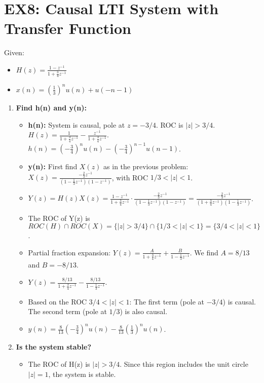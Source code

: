 \documentclass[a4paper,12pt]{article}
\begin{document}
\section*{EX8: Causal LTI System with Transfer Function}
Given:
\begin{itemize}
    \item $H(z) = \frac{1-z^{-1}}{1+\frac{3}{4}z^{-1}}$
    \item $x(n) = (\frac{1}{3})^n u(n) + u(-n-1)$
\end{itemize}
\begin{enumerate}
    \item \textbf{Find h(n) and y(n):}
        \begin{itemize}
            \item \textbf{h(n):} System is causal, pole at $z=-3/4$. ROC is $|z|>3/4$.
            $H(z) = \frac{1}{1+\frac{3}{4}z^{-1}} - \frac{z^{-1}}{1+\frac{3}{4}z^{-1}}$.
            $h(n) = (-\frac{3}{4})^n u(n) - (-\frac{3}{4})^{n-1} u(n-1)$.
            \item \textbf{y(n):} First find $X(z)$ as in the previous problem: $X(z) = \frac{-\frac{2}{3}z^{-1}}{(1-\frac{1}{3}z^{-1})(1-z^{-1})}$, with ROC $1/3 < |z| < 1$.
            \item $Y(z) = H(z)X(z) = \frac{1-z^{-1}}{1+\frac{3}{4}z^{-1}} \cdot \frac{-\frac{2}{3}z^{-1}}{(1-\frac{1}{3}z^{-1})(1-z^{-1})} = \frac{-\frac{2}{3}z^{-1}}{(1+\frac{3}{4}z^{-1})(1-\frac{1}{3}z^{-1})}$.
            \item The ROC of Y(z) is $ROC(H) \cap ROC(X) = \{|z|>3/4\} \cap \{1/3<|z|<1\} = \{3/4 < |z| < 1\}$.
            \item Partial fraction expansion: $Y(z) = \frac{A}{1+\frac{3}{4}z^{-1}} + \frac{B}{1-\frac{1}{3}z^{-1}}$. We find $A=8/13$ and $B=-8/13$.
            \item $Y(z) = \frac{8/13}{1+\frac{3}{4}z^{-1}} - \frac{8/13}{1-\frac{1}{3}z^{-1}}$.
            \item Based on the ROC $3/4 < |z| < 1$:
            The first term (pole at $-3/4$) is causal. The second term (pole at $1/3$) is also causal.
            \item $y(n) = \frac{8}{13}(-\frac{3}{4})^n u(n) - \frac{8}{13}(\frac{1}{3})^n u(n)$.
        \end{itemize}
    \item \textbf{Is the system stable?}
        \begin{itemize}
            \item The ROC of H(z) is $|z|>3/4$. Since this region includes the unit circle $|z|=1$, the system is stable.
        \end{itemize}
\end{enumerate}
\end{document}

